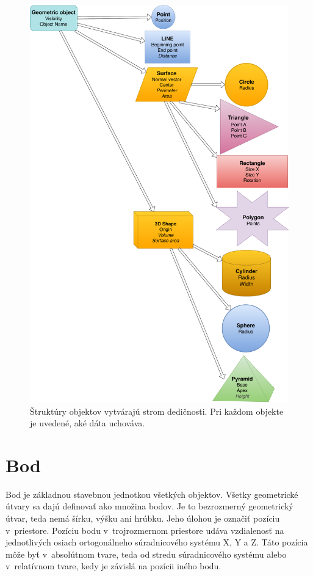 \begin{figure}[]
	\centering
	\includegraphics[height=0.95\textheight]{obrazky-figures/Diagram/Draw/DP Navrh operacii-Structure.pdf}
	\caption{Štruktúry objektov vytvárajú strom dedičnosti. Pri každom objekte je uvedené, aké dáta uchováva. }
	\label{fig:StromDedicnosti}
\end{figure}

\section{Bod}
Bod je základnou stavebnou jednotkou všetkých objektov. Všetky geometrické útvary sa dajú definovať ako množina bodov. Je to bezrozmerný geometrický útvar, teda nemá šírku, výšku ani hrúbku. Jeho úlohou je označiť pozíciu v~priestore. Pozíciu bodu v~trojrozmernom priestore udáva vzdialenosť na jednotlivých osiach ortogonálneho súradnicového systému X, Y a Z. Táto pozícia môže byť v~absolútnom tvare, teda od stredu súradnicového systému alebo v~relatívnom tvare, kedy je závislá na pozícii iného bodu.




